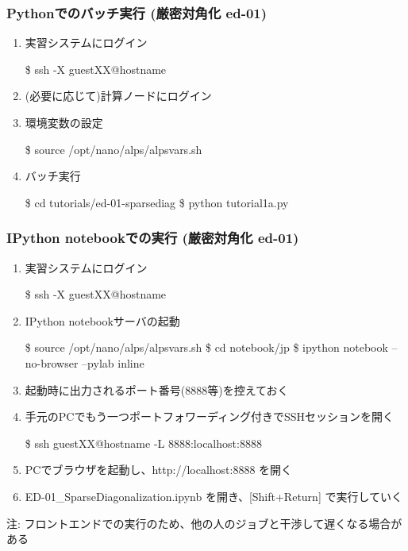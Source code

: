 \begin{frame}[fragile]
  \frametitle{Pythonでのバッチ実行 (厳密対角化 ed-01)}
  \begin{enumerate}
  \item 実習システムにログイン
\begin{semiverbatim}
\$ ssh -X guest{\color{red}XX}@{\color{red}hostname}
\end{semiverbatim}
  \item (必要に応じて)計算ノードにログイン
  \item 環境変数の設定
\begin{semiverbatim}
\$ source /opt/nano/alps/alpsvars.sh
\end{semiverbatim}
  \item バッチ実行
\begin{semiverbatim}
\$ cd tutorials/ed-01-sparsediag
\$ python tutorial1a.py
\end{semiverbatim}
  \end{enumerate}
\end{frame}

\begin{frame}[fragile,shrink=10]
  \frametitle{IPython notebookでの実行 (厳密対角化 ed-01)}
  \begin{enumerate}
  \item 実習システムにログイン
\begin{semiverbatim}
\$ ssh -X guest{\color{red}XX}@{\color{red}hostname}
\end{semiverbatim}
  \item IPython notebookサーバの起動
\begin{semiverbatim}
\$ source /opt/nano/alps/alpsvars.sh
\$ cd notebook/jp
\$ ipython notebook --no-browser --pylab inline
\end{semiverbatim}
  \item 起動時に出力されるポート番号(8888等)を控えておく
  \item 手元のPCでもう一つポートフォワーディング付きでSSHセッションを開く
\begin{semiverbatim}
\$ ssh guest{\color{red}XX}@{\color{red}hostname} -L 8888:localhost:8888
\end{semiverbatim}
  \item PCでブラウザを起動し、http://localhost:8888 を開く
  \item ED-01\_SparseDiagonalization.ipynb を開き、[Shift+Return] で実行していく
  \end{enumerate}
  注: フロントエンドでの実行のため、他の人のジョブと干渉して遅くなる場合がある
\end{frame}

